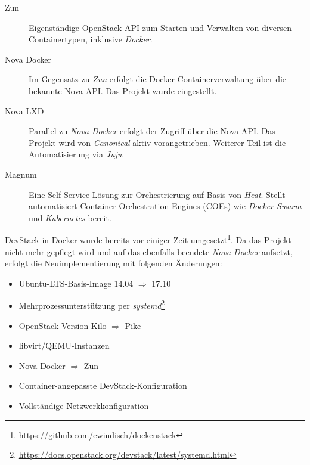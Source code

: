 \begin{description}
	
	\item[Zun\footnotemark] Eigenständige OpenStack-API zum Starten und Verwalten von diversen Containertypen, inklusive \emph{Docker}.
	
	\item[Nova Docker\footnotemark] Im Gegensatz zu \emph{Zun} erfolgt die Docker-Containerverwaltung über die bekannte Nova-API. Das Projekt wurde eingestellt.
	
	\item[Nova LXD\footnotemark] Parallel zu \emph{Nova Docker} erfolgt der Zugriff über die Nova-API. Das Projekt wird von \emph{Canonical} aktiv vorangetrieben. Weiterer Teil ist die Automatisierung via \emph{Juju}.
	
	\item[Magnum\footnotemark] Eine Self-Service-Lösung zur Orchestrierung auf Basis von \emph{Heat}. Stellt automatisiert Container Orchestration Engines (COEs) wie \emph{Docker Swarm} und \emph{Kubernetes} bereit.
	
\end{description}

\noindent DevStack in Docker wurde bereits vor einiger Zeit umgesetzt\footnote{\url{https://github.com/ewindisch/dockenstack}}. Da das Projekt nicht mehr gepflegt wird und auf das ebenfalls beendete \emph{Nova Docker} aufsetzt, erfolgt die Neuimplementierung mit folgenden Änderungen:

\begin{itemize}
	
	\item Ubuntu-LTS-Basis-Image 14.04 $\Rightarrow$ 17.10
	\item Mehrprozessunterstützung per \emph{systemd}\footnote{\url{https://docs.openstack.org/devstack/latest/systemd.html}}
	\item OpenStack-Version Kilo $\Rightarrow$ Pike
	\item libvirt/QEMU-Instanzen
	\item Nova Docker $\Rightarrow$ Zun
	\item Container-angepasste DevStack-Konfiguration
	\item Vollständige Netzwerkkonfiguration
	
\end{itemize}

